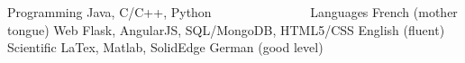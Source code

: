 

\begin{cvskillsF}

  \cvskillF
    {Programming} %
    {Java, C/C++, Python} %
    {\ \ \ \ \ \ \ \ \ \ \ \ \ \ \ Languages} %
    {French (mother tongue)} %
  \cvskillF
    {Web} %
    {Flask, AngularJS, SQL/MongoDB, HTML5/CSS} %
    {} %
    {English (fluent)} %
  \cvskillF
    {Scientific} %
    {LaTex, Matlab, SolidEdge} %
    {} %
    {German (good level)} %
\end{cvskillsF}
